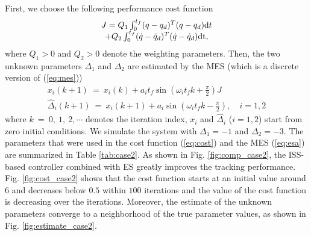 \documentclass[twoside,leqno,onecolumn]{article}
\begin{document}
First, we choose the following performance cost function
\begin{equation}\begin{array}{c} J=Q_1\int_{0}^{t_f}
(q-q_d)^T(q-q_d) {\rm{d}} t \\+Q_2\int_{0}^{t_f} (\dot q-\dot
{q}_d)^T(\dot q-\dot q_d) \rm{d}t,
\end{array}\label{eq:cost}
\end{equation}
where $Q_1>0$ and $Q_2>0$ denote the weighting parameters. Then,
the two unknown parameters $\Delta_1$ and $\Delta_2$ are estimated
by the MES (which is a discrete version of (\ref{eq:mes}))
\begin{equation}
\begin{array}{l}
\displaystyle {x}_i (k+1) ~=~x_i(k) + a_i t_f \sin(\omega_i t_f  k +\frac{\pi}{2}) J\\
\displaystyle  \widehat{\Delta}_i(k+1)~=~x_i(k+1) + a_i
\sin(\omega_i  t_f k -\frac{\pi}{2}) ,\quad i  =1,2
\end{array}
\label{eq:esa}
\end{equation}
where $k ~=~0,~1,~2,\cdots$ denotes the iteration index, $x_i$ and
$\widehat{\Delta}_i$ ($i = 1,2$) start from zero initial
conditions. We simulate the system with $\Delta_1 = -1$ and
$\Delta_2 = -3$. The parameters that were used in the cost
function (\ref{eq:cost}) and the MES (\ref{eq:esa}) are summarized
in Table \ref{tab:case2}.
As shown in Fig. \ref{fig:comp_case2}, the ISS-based controller
combined with ES greatly improves the tracking performance. Fig.
\ref{fig:cost_case2} shows that the cost function starts at an
initial value around $6$ and decreases below $0.5$ within $100$
iterations and the value of the cost function is decreasing over
the iterations. Moreover, the estimate of the unknown parameters
converge to a neighborhood of the true parameter values, as shown
in Fig. \ref{fig:estimate_case2}.
\end{document}
